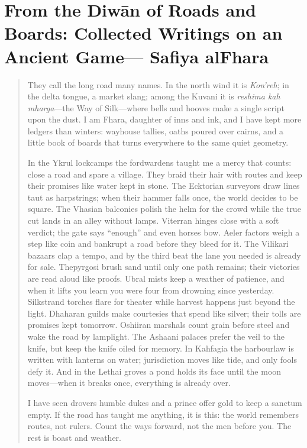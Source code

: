 \documentclass[11pt]{article}
\begin{document}
\section{From the Diwān of Roads and Boards: Collected Writings on an Ancient Game— Safiya al\textendash Fhara}
\begin{quote}\small
They call the long road many names. In the north wind it is \emph{Kon'reh}; in the delta tongue, a market slang; among the Kuvani it is \emph{reshima kah mharga}—the Way of Silk—where bells and hooves make a single script upon the dust. I am Fhara, daughter of inns and ink, and I have kept more ledgers than winters: way\textendash house tallies, oaths poured over cairns, and a little book of boards that turns everywhere to the same quiet geometry.

In the Ykrul lock\textendash camps the ford\textendash wardens taught me a mercy that counts: close a road and spare a village. They braid their hair with routes and keep their promises like water kept in stone. The Ecktorian surveyors draw lines taut as harp\textendash strings; when their hammer falls once, the world decides to be square. The Vhasian balconies polish the helm for the crowd while the true cut lands in an alley without lamps. Viterran hinges close with a soft verdict; the gate says “enough” and even horses bow. Aeler factors weigh a step like coin and bankrupt a road before they bleed for it. The Vilikari bazaars clap a tempo, and by the third beat the lane you needed is already for sale. Thepyrgosi brush sand until only one path remains; their victories are read aloud like proofs. Ubral mists keep a weather of patience, and when it lifts you learn you were four from drowning since yesterday. Silkstrand torches flare for theater while harvest happens just beyond the light. Dhaharan guilds make courtesies that spend like silver; their tolls are promises kept tomorrow. Oshiiran marshals count grain before steel and wake the road by lamp\textendash light. The Ashaani palaces prefer the veil to the knife, but keep the knife oiled for memory. In Kahfagia the harbour\textendash law is written with lanterns on water; jurisdiction moves like tide, and only fools defy it. And in the Lethai groves a pond holds its face until the moon moves—when it breaks once, everything is already over.

I have seen drovers humble dukes and a prince offer gold to keep a sanctum empty. If the road has taught me anything, it is this: the world remembers routes, not rulers. Count the ways forward, not the men before you. The rest is boast and weather.
\end{quote}
\end{document}
